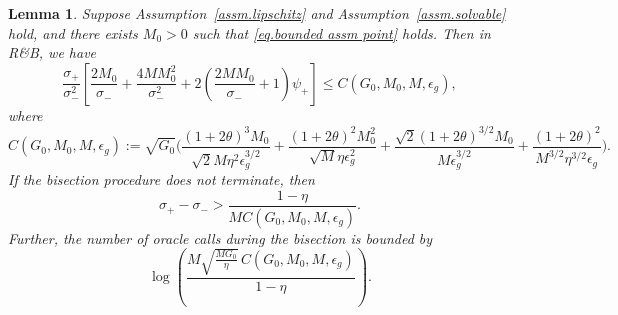 \documentclass{article}
\newtheorem{lemma}[theorem]{Lemma}
\numberwithin{equation}{section}
\numberwithin{equation}{section}
\begin{document}
\begin{lemma}
    \label{coro.bisection bound}
    Suppose Assumption~\ref{assm.lipschitz} and
    Assumption~\ref{assm.solvable} hold, and there exists \(M_0>0\) such that
    \eqref{eq.bounded assm point} holds. Then in \textnormal{R\&B}, we have
    \begin{equation}
        \label{eq.bisection-coefficient-bound}
        \frac{\sigma_+}{\sigma_-^2}
        \left[
            \frac{2M_0}{\sigma_-}
            +
            \frac{4MM_0^2}{\sigma_-^2}
            +
            2\left(
            \frac{2MM_0}{\sigma_-}+1
            \right)\psi_+
            \right] \leq
        C(G_0,M_0,M,\epsilon_g),
    \end{equation}
    where
    \begin{equation}
        \label{eq.definition C bisection}
        C(G_0,M_0,M,\epsilon_g)
        :=
        \sqrt{G_0}\Bigg(
        \frac{(1+2\theta)^3M_0}
            {\sqrt{2}M\eta^2\epsilon_g^{3/2}}
        +
        \frac{(1+2\theta)^2M_0^2}
            {\sqrt{M}\eta\epsilon_g^2}
        +
        \frac{\sqrt{2}(1+2\theta)^{3/2}M_0}
            {M\epsilon_g^{3/2}}
        +
        \frac{(1+2\theta)^2}
            {M^{3/2}\eta^{3/2}\epsilon_g}
        \Bigg).
    \end{equation}
    If the bisection procedure does not terminate, then
    \begin{equation}
        \label{eq.bound value by brackets}
        \sigma_+-\sigma_-
        >
        \frac{1-\eta}
        {M C(G_0,M_0,M,\epsilon_g)}.
    \end{equation}
    Further, the number of oracle calls during the bisection is bounded by
    \begin{equation}
        \label{eq.bisection-oracle-bound}
        \log\left(
        \frac{
                M\sqrt{\frac{MG_0}{\eta}}\,
                C(G_0,M_0,M,\epsilon_g)
            }{
                1-\eta
            }
        \right).
    \end{equation}
\end{lemma}
\end{document}
